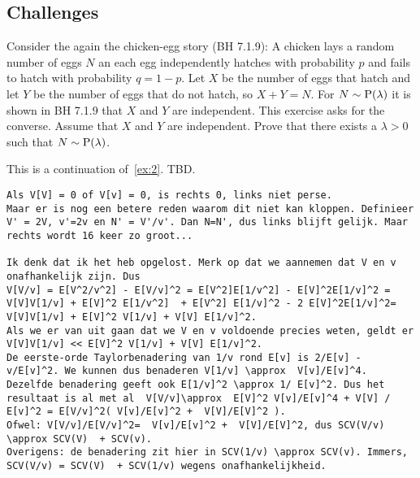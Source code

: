 \documentclass[assignments]{subfiles}
\begin{document}
\subsection{Challenges}
\label{sec:above-exam-level}

\begin{exercise} %
Consider the again the chicken-egg story (BH 7.1.9): A chicken lays a random number of eggs $N$ an each egg independently hatches with probability $p$ and fails to hatch with probability $q = 1-p$. Let $X$ be the number of eggs that hatch and let $Y$ be the number of eggs that do not hatch, so $X+Y = N$. 
For $N \sim \mathrm{P}(\lambda)$ it is shown in BH 7.1.9 that $X$ and $Y$ are independent. This exercise asks for the converse. Assume that $X$ and $Y$ are independent. Prove that there exists a $\lambda > 0$ such that $N \sim \mathrm{P}(\lambda)$.
\end{exercise}


\begin{exercise}\label{ex:3}
This is a continuation of~\cref{ex:2}.  TBD.
 
\begin{verbatim}
Als V[V] = 0 of V[v] = 0, is rechts 0, links niet perse.
Maar er is nog een betere reden waarom dit niet kan kloppen. Definieer V' = 2V, v'=2v en N' = V'/v'. Dan N=N', dus links blijft gelijk. Maar rechts wordt 16 keer zo groot...

Ik denk dat ik het heb opgelost. Merk op dat we aannemen dat V en v onafhankelijk zijn. Dus
V[V/v] = E[V^2/v^2] - E[V/v]^2 = E[V^2]E[1/v^2] - E[V]^2E[1/v]^2 = V[V]V[1/v] + E[V]^2 E[1/v^2]  + E[V^2] E[1/v]^2 - 2 E[V]^2E[1/v]^2= V[V]V[1/v] + E[V]^2 V[1/v] + V[V] E[1/v]^2.
Als we er van uit gaan dat we V en v voldoende precies weten, geldt er V[V]V[1/v] << E[V]^2 V[1/v] + V[V] E[1/v]^2.
De eerste-orde Taylorbenadering van 1/v rond E[v] is 2/E[v] - v/E[v]^2. We kunnen dus benaderen V[1/v] \approx  V[v]/E[v]^4.
Dezelfde benadering geeft ook E[1/v]^2 \approx 1/ E[v]^2. Dus het resultaat is al met al  V[V/v]\approx  E[V]^2 V[v]/E[v]^4 + V[V] / E[v]^2 = E[V/v]^2( V[v]/E[v]^2 +  V[V]/E[V]^2 ).
Ofwel: V[V/v]/E[V/v]^2=  V[v]/E[v]^2 +  V[V]/E[V]^2, dus SCV(V/v) \approx SCV(V)  + SCV(v).
Overigens: de benadering zit hier in SCV(1/v) \approx SCV(v). Immers, SCV(V/v) = SCV(V)  + SCV(1/v) wegens onafhankelijkheid. 

\end{verbatim}


\end{exercise}
\end{document}
